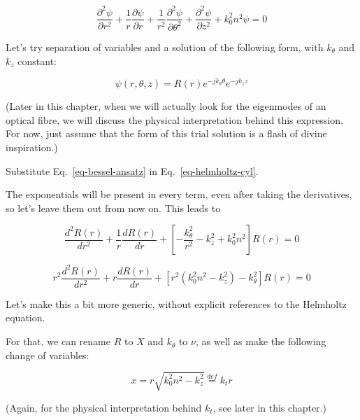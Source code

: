 \begin{equation}
\frac{\partial^2 \psi}{\partial r^2} + \frac{1}{r} \frac{\partial \psi}{\partial r} +\frac{1}{r^2} \frac{\partial^2 \psi}{\partial \theta^2} + \frac{\partial^2 \psi}{\partial z^2} + k_0^2 n^2\psi = 0 \label{eq-helmholtz-cyl}
\end{equation}

Let's try separation of variables and a solution of the following form, with $k_\theta$ and $k_z$ constant: 

\begin{equation}
\psi(r,\theta,z) = R(r)e^{-j k_\theta \theta }e^{-j k_z z}
\label{eq-bessel-ansatz}
\end{equation}  

(Later in this chapter, when we will actually look for the eigenmodes of an optical fibre, we will discuss the physical interpretation behind this expression. For now, just assume that the form of this trial solution is a flash of divine inspiration.)

\begin{cue}
Substitute Eq.~\ref{eq-bessel-ansatz} in Eq.~\ref{eq-helmholtz-cyl}.
\end{cue}

The exponentials will be present in every term, even after taking the derivatives, so let's leave them out from now on. This leads to

\begin{equation}
\frac{d^2 R(r)}{d r^2} + \frac{1}{r} \frac{d R(r)}{d r} + \left[ - \frac{k_\theta^2}{r^2} - k_z^2 + k_0^2 n^2\right] R(r) = 0
\end{equation} 

\begin{equation}
r^2\frac{d^2 R(r)}{d r^2} + r \frac{d R(r)}{d r} + \left[ r^2 (k_0^2 n^2 - k_z^2)- k_\theta^2 \right] R(r) = 0
\end{equation}

Let's make this a bit more generic, without explicit references to the Helmholtz equation.

For that, we can rename $R$ to $X$ and $k_\theta$ to $\nu$, as well as make the following change of variables:

\begin{equation}
x = r \sqrt{k_0^2 n^2 - k_z^2} \stackrel{def}{=} k_t r
\end{equation}

(Again, for the physical interpretation behind $k_t$, see later in this chapter.)

